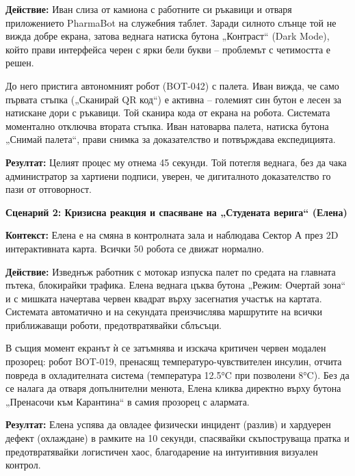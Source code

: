 \documentclass[12pt, a4paper]{article}
\begin{document}
\smallskip
\noindent\textbf{Действие:} Иван слиза от камиона с работните си ръкавици и отваря приложението PharmaBot на служебния таблет. Заради силното слънце той не вижда добре екрана, затова веднага натиска бутона „Контраст“ (Dark Mode), който прави интерфейса черен с ярки бели букви – проблемът с четимостта е решен. 

До него пристига автономният робот (BOT-042) с палета. Иван вижда, че само първата стъпка („Сканирай QR код“) е активна – големият син бутон е лесен за натискане дори с ръкавици. Той сканира кода от екрана на робота. Системата моментално отключва втората стъпка. Иван натоварва палета, натиска бутона „Снимай палета“, прави снимка за доказателство и потвърждава експедицията.

\smallskip
\noindent\textbf{Резултат:} Целият процес му отнема 45 секунди. Той потегля веднага, без да чака администратор за хартиени подписи, уверен, че дигиталното доказателство го пази от отговорност.

\bigskip
\noindent\textbf{Сценарий 2: Кризисна реакция и спасяване на „Студената верига“ (Елена)}

\smallskip
\noindent\textbf{Контекст:} Елена е на смяна в контролната зала и наблюдава Сектор А през 2D интерактивната карта. Всички 50 робота се движат нормално.

\smallskip
\noindent\textbf{Действие:} Изведнъж работник с мотокар изпуска палет по средата на главната пътека, блокирайки трафика. Елена веднага цъква бутона „Режим: Очертай зона“ и с мишката начертава червен квадрат върху засегнатия участък на картата. Системата автоматично и на секундата преизчислява маршрутите на всички приближаващи роботи, предотвратявайки сблъсъци. 

В същия момент екранът ѝ се затъмнява и изскача критичен червен модален прозорец: робот BOT-019, пренасящ температуро-чувствителен инсулин, отчита повреда в охладителната система (температура 12.5°C при позволени 8°C). Без да се налага да отваря допълнителни менюта, Елена кликва директно върху бутона „Пренасочи към Карантина“ в самия прозорец с алармата.

\smallskip
\noindent\textbf{Резултат:} Елена успява да овладее физически инцидент (разлив) и хардуерен дефект (охлаждане) в рамките на 10 секунди, спасявайки скъпоструваща пратка и предотвратявайки логистичен хаос, благодарение на интуитивния визуален контрол.
\end{document}
